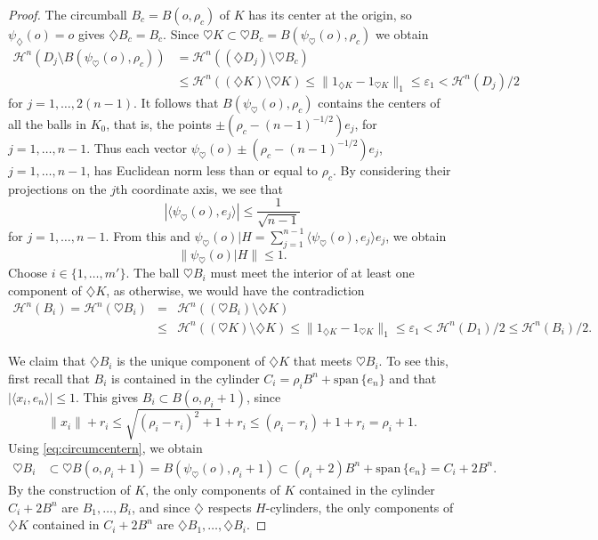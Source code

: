 \documentclass[10pt,a4paper]{amsart}
\newcommand{\cH}{{\mathcal H}}
\newcommand{\di}{\diamondsuit}
\newcommand{\ee}{\varepsilon}
\newcommand{\myspan}{{\mathrm{span}}\,}
\begin{document}
\begin{proof}
The circumball $B_c=B(o,\rho_c)$ of $K$ has its center at the origin, so $\psi_\di(o)=o$ gives $\di B_c=B_c$. Since $\heartsuit K\subset \heartsuit B_c=B(\psi_{\heartsuit}(o),\rho_c)$ we obtain
\begin{align*}
\cH^n\left(D_j\setminus B(\psi_{\heartsuit}(o),\rho_c)\right)
&=\cH^n\left((\di D_j)\setminus \heartsuit B_c\right)\\
&\le \cH^n((\di K)\setminus \heartsuit K)\le \|1_{\di K}-1_{\heartsuit K}\|_1\le \ee_1<{\cH}^n(D_j)/2
\end{align*}
for $j=1,\dots,2(n-1)$.  It follows that $B(\psi_{\heartsuit}(o),\rho_c)$ contains the centers of all the balls in $K_0$, that is, the points $\pm (\rho_c-(n-1)^{-1/2}) e_j$, for $j=1,\dots,n-1$.  Thus each vector $\psi_{\heartsuit}(o)\pm (\rho_c-(n-1)^{-1/2}) e_j$, $j=1,\dots,n-1$, has Euclidean norm less than or equal to $\rho_c$.  By considering their projections on the $j$th coordinate axis, we see that
$$|\langle \psi_{\heartsuit}(o), e_j\rangle|\le \frac1{\sqrt{n-1}}$$
for $j=1,\dots,n-1$.  From this and $\psi_{\heartsuit}(o)|H=\sum_{j=1}^{n-1}\langle \psi_{\heartsuit}(o),e_j\rangle e_j$, we obtain
\begin{equation}\label{eq:circumcentern}
\|\psi_{\heartsuit}(o)|H\|\le 1.
\end{equation}
Choose $i\in \{1,\ldots, m'\}$. The ball $\heartsuit B_i$ must meet the interior of at least one component of $\di K$, as otherwise, we would have the contradiction
\begin{eqnarray*}
{\cH}^n(B_i) = {\cH}^n(\heartsuit B_i)&=&\cH^n\left( (\heartsuit B_i)\setminus \di K\right)\\
&\le& \cH^n\left( (\heartsuit K)\setminus \di K\right)
\le \|1_{\di K}-1_{\heartsuit K}\|_1\le
\ee_1< {\cH}^n(D_1)/2\le {\cH}^n(B_i)/2.
\end{eqnarray*}

We claim that $\di B_i$ is the unique component of $\di K$ that meets $\heartsuit B_i$. To see this, first recall that $B_i$ is contained in the cylinder $C_i=\rho_i B^n+\myspan\{e_n\}$ and that $|\langle x_i,e_n\rangle|\le 1$. This gives $B_i\subset B(o,\rho_i+1)$, since
\[
\|x_i\|+r_i\le \sqrt{(\rho_i-r_i)^2+1}+r_i\le (\rho_i-r_i)+1+r_i=\rho_i+1.
\]
Using \eqref{eq:circumcentern}, we obtain
\begin{align*}
\heartsuit B_i&\subset
\heartsuit B\left(o,\rho_i+1\right)
=B\left(\psi_{\heartsuit}(o),\rho_i+1\right)\subset
(\rho_i+2) B^n+\myspan\{e_n\}=C_i+2B^n.
\end{align*}
By the construction of $K$, the only components of $K$ contained in the cylinder $C_i+2B^n$ are $B_1,\ldots,B_i$, and since $\di$ respects $H$-cylinders, the only components of $\di K$ contained in  $C_i+2B^n$ are  $\di B_1,\ldots,\di B_i$.


\end{proof}
\end{document}
